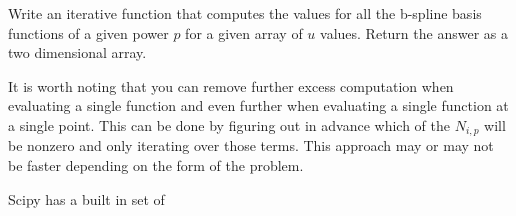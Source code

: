 \begin{problem}
Write an iterative function that computes the values for all the b-spline basis functions of a given power $p$ for a given array of $u$ values. Return the answer as a two dimensional array.
\end{problem}

It is worth noting that you can remove further excess computation when evaluating a single function and even further when evaluating a single function at a single point.
This can be done by figuring out in advance which of the $N_{i,p}$ will be nonzero and only iterating over those terms.
This approach may or may not be faster depending on the form of the problem.

Scipy has a built in set of